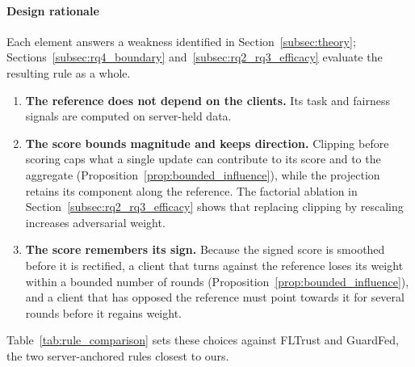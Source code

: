 \paragraph{Design rationale}
Each element answers a weakness identified in Section~\ref{subsec:theory}; Sections~\ref{subsec:rq4_boundary} and~\ref{subsec:rq2_rq3_efficacy} evaluate the resulting rule as a whole.
\begin{enumerate}[leftmargin=*, label=(\roman*)]
    \item \textbf{The reference does not depend on the clients.} Its task and fairness signals are computed on server-held data.
    \item \textbf{The score bounds magnitude and keeps direction.} Clipping before scoring caps what a single update can contribute to its score and to the aggregate (Proposition~\ref{prop:bounded_influence}), while the projection retains its component along the reference. The factorial ablation in Section~\ref{subsec:rq2_rq3_efficacy} shows that replacing clipping by rescaling increases adversarial weight.
    \item \textbf{The score remembers its sign.} Because the signed score is smoothed before it is rectified, a client that turns against the reference loses its weight within a bounded number of rounds (Proposition~\ref{prop:bounded_influence}), and a client that has opposed the reference must point towards it for several rounds before it regains weight.
\end{enumerate}

Table~\ref{tab:rule_comparison} sets these choices against FLTrust and GuardFed, the two server-anchored rules closest to ours.

